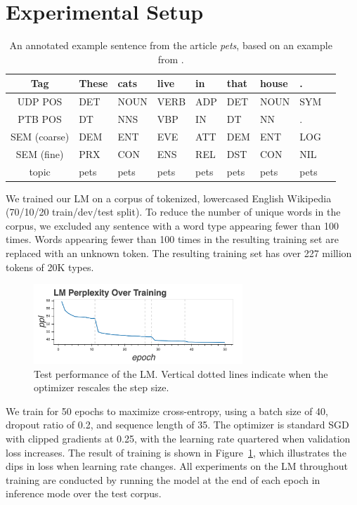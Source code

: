 \section{Experimental Setup}



\begin{table}[ht]
\centering
\begin{tabular}{c | llllllll}
Tag & These & cats & live & in & that & house & . \\
\hline
UDP POS & DET & NOUN & VERB & ADP & DET & NOUN & SYM \\
PTB POS & DT & NNS & VBP & IN & DT & NN & . \\
SEM (coarse) & DEM & ENT & EVE & ATT & DEM & ENT & LOG \\
SEM (fine) & PRX & CON & ENS & REL & DST & CON & NIL \\
topic & pets & pets & pets & pets & pets & pets & pets \\
\end{tabular}
\caption{An annotated example sentence from the article \textit{pets}, based on an example from \citeauthor{bjerva_semantic_2016}.}
\label{fig:example}
\end{table}


We trained our LM on a corpus of tokenized, lowercased English Wikipedia (70/10/20 train/dev/test split). To reduce the number of unique words in the corpus, we excluded any sentence with a word type appearing fewer than 100 times. Words appearing fewer than 100 times in the resulting training set are replaced with an unknown token. The resulting training set has over 227 million tokens of 20K types.

\begin{figure}\centering
\includegraphics[width=0.7\textwidth]{svcca/loss}
\caption{Test performance of the LM. Vertical dotted lines indicate when the optimizer rescales the step size.}
\label{fig:loss}
\end{figure}

We train for 50 epochs to maximize cross-entropy, using a batch size of 40, dropout ratio of 0.2, and sequence length of 35. The optimizer is standard SGD with clipped gradients at 0.25, with the learning rate quartered when validation loss increases. The result of training is shown in Figure~\ref{fig:loss}, which illustrates the dips in loss when learning rate changes. All experiments on the LM throughout training are conducted by running the model at the end of each epoch in inference mode over the test corpus.

